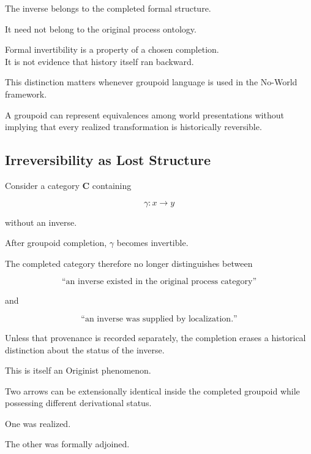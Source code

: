 \documentclass[
  11pt,
  a4paper,
  DIV=12,
  BCOR=0mm,
  parskip=half-
]{scrartcl}
\theoremstyle{definition}
\theoremstyle{plain}
\theoremstyle{remark}
\begin{document}
The inverse belongs to the completed formal structure.

It need not belong to the original process ontology.

\begin{held}
\centering
Formal invertibility is a property of a chosen completion.\\[3pt]
It is not evidence that history itself ran backward.
\end{held}

This distinction matters whenever groupoid language is used in the No-World
framework.

A groupoid can represent equivalences among world presentations without
implying that every realized transformation is historically reversible.


\subsection{Irreversibility as Lost Structure}
\label{app:groupoid-loss}

Consider a category \(\mathbf C\) containing

\[
  \gamma:x\to y
\]

without an inverse.

After groupoid completion, \(\gamma\) becomes invertible.

The completed category therefore no longer distinguishes between

\[
  \text{``an inverse existed in the original process category''}
\]

and

\[
  \text{``an inverse was supplied by localization.''}
\]

Unless that provenance is recorded separately, the completion erases a
historical distinction about the status of the inverse.

This is itself an Originist phenomenon.

Two arrows can be extensionally identical inside the completed groupoid while
possessing different derivational status.

One was realized.

The other was formally adjoined.

\end{document}
